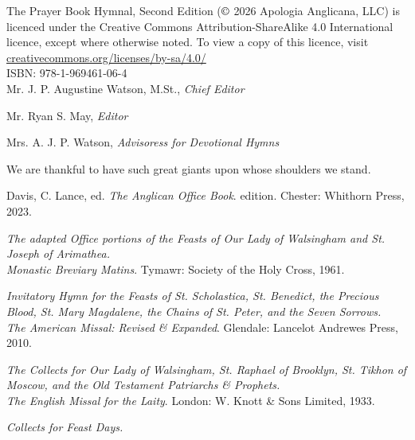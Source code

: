 
{}

\noindent
The Prayer Book Hymnal, Second Edition ($\copyright$ 2026 Apologia Anglicana, LLC) is licenced under the Creative Commons Attribution-ShareAlike 4.0 International licence, except where otherwise noted. To view a copy of this licence, visit \url{creativecommons.org/licenses/by-sa/4.0/}\\

ISBN: 978-1-969461-06-4\\

Mr. J. P. Augustine Watson, M.St., \textit{Chief Editor}

Mr. Ryan S. May, \textit{Editor}

Mrs. A. J. P. Watson, \textit{Advisoress for Devotional Hymns}
	

\begin{center}
	We are thankful to have such great giants upon whose shoulders we stand.%
\end{center}


Davis, C. Lance, ed. \textit{The Anglican Office Book}.  edition. Chester: Whithorn Press, 2023.\par\noindent
\textit{The adapted Office portions of the Feasts of Our Lady of Walsingham and St. Joseph of Arimathea.}\\

\textit{Monastic Breviary Matins}. Tymawr: Society of the Holy Cross, 1961.\par\noindent
\textit{Invitatory Hymn for the Feasts of St. Scholastica, St. Benedict, the Precious Blood, St. Mary Magdalene, the Chains of St. Peter, and the Seven Sorrows.}\\

\textit{The American Missal: Revised \& Expanded}. Glendale: Lancelot Andrewes Press, 2010.\par\noindent
\textit{The Collects for Our Lady of Walsingham, St. Raphael of Brooklyn, St. Tikhon of Moscow, and the Old Testament Patriarchs \& Prophets.}\\

\textit{The English Missal for the Laity}. London: W. Knott \& Sons Limited, 1933.\par\noindent
\textit{Collects for Feast Days.}\\

